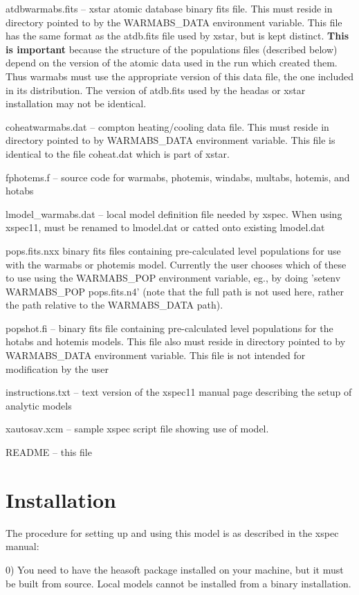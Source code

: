atdbwarmabs.fits  -- xstar atomic database binary fits file.
This must reside in directory pointed to by the WARMABS\_DATA 
environment variable.  This file has the same format  as the atdb.fits file 
used by xstar, but is kept distinct.  {\bf This is important} because the 
structure of the populations files (described below) depend on the 
version of the atomic data used in the run which created them.  Thus 
warmabs must use the appropriate version of this data file, the one 
included in its distribution.  The version of atdb.fits used by the headas or 
xstar installation may not be identical.

coheatwarmabs.dat -- compton heating/cooling data file.
This must reside in directory pointed to by WARMABS\_DATA 
environment variable.  This file is identical to the file 
coheat.dat which is part of xstar.

fphotems.f -- source code for warmabs, photemis, windabs, 
multabs, hotemis, and hotabs

lmodel\_warmabs.dat -- local model definition file needed by xspec.  
When using xspec11, must be renamed to lmodel.dat or catted 
onto existing lmodel.dat

pops.fits.nxx  binary fits files containing pre-calculated level populations 
for use with the warmabs or  photemis model.   Currently the user chooses 
which of these to use using the WARMABS\_POP environment variable, eg., by 
doing 'setenv WARMABS\_POP pops.fits.n4' (note that the full path is not used
here, rather the path relative to the WARMABS\_DATA path).

popshot.fi -- binary fits file containing pre-calculated level populations for the hotabs and
hotemis models. This file also must reside in directory pointed to by 
WARMABS\_DATA environment variable. This file is not intended for modification by the user

instructions.txt --  text version of the xspec11 manual page describing the  
setup of analytic models

xautosav.xcm -- sample xspec script file showing use of model.

README     -- this file

\section{Installation}

The procedure for setting up and using this model is as described in the 
xspec manual:


0) You need to have the heasoft package installed on your 
machine, but it must be built from source.  Local models 
cannot be installed from a binary installation.

